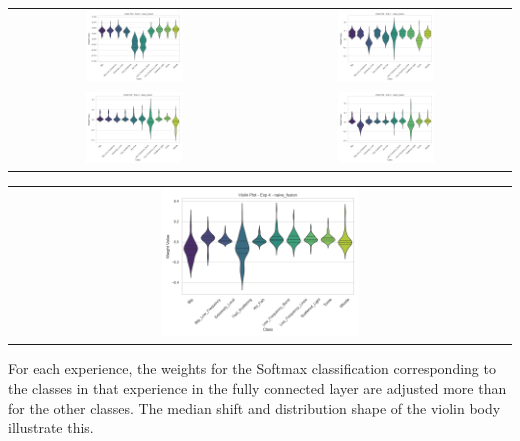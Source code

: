 \begin{center}
\begin{tabular}{cc}
\includegraphics[width=0.4\textwidth]{Images/naive_fusion_exp_0.png} & \includegraphics[width=0.4\textwidth]{Images/naive_fusion_exp_1.png} \\
\includegraphics[width=0.4\textwidth]{Images/naive_fusion_exp_2.png} & \includegraphics[width=0.4\textwidth]{Images/naive_fusion_exp_3.png}
\end{tabular}
\end{center}
\begin{center}
    \begin{tabular}{c|c}
         \multicolumn{2}{c}{\includegraphics[width=0.4\textwidth]{Images/naive_fusion_exp_4.png}}
    \end{tabular}
\end{center}
For each experience, the weights for the Softmax classification corresponding to the classes in that experience in the fully connected layer are adjusted more than for the other classes. The median shift and distribution shape of the violin body illustrate this. 

